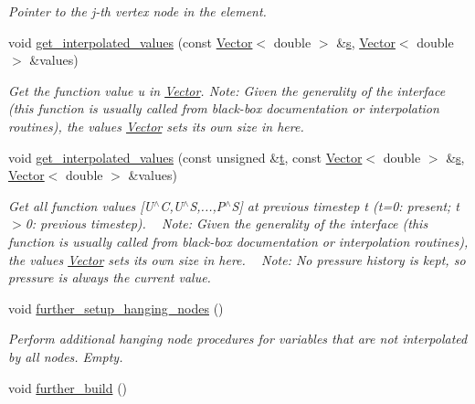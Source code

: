 \begin{DoxyCompactItemize}
\begin{DoxyCompactList}\small\item\em Pointer to the j-\/th vertex node in the element. \end{DoxyCompactList}\item 
void \hyperlink{classoomph_1_1RefineableLinearisedAxisymmetricQCrouzeixRaviartElement_afd5811a7632c57472e08dbcfa9aba843}{get\+\_\+interpolated\+\_\+values} (const \hyperlink{classoomph_1_1Vector}{Vector}$<$ double $>$ \&\hyperlink{cfortran_8h_ab7123126e4885ef647dd9c6e3807a21c}{s}, \hyperlink{classoomph_1_1Vector}{Vector}$<$ double $>$ \&values)
\begin{DoxyCompactList}\small\item\em Get the function value u in \hyperlink{classoomph_1_1Vector}{Vector}. Note\+: Given the generality of the interface (this function is usually called from black-\/box documentation or interpolation routines), the values \hyperlink{classoomph_1_1Vector}{Vector} sets its own size in here. \end{DoxyCompactList}\item 
void \hyperlink{classoomph_1_1RefineableLinearisedAxisymmetricQCrouzeixRaviartElement_a46c6b74a900afc0038bcd4f6c33c6c47}{get\+\_\+interpolated\+\_\+values} (const unsigned \&\hyperlink{cfortran_8h_af6f0bd3dc13317f895c91323c25c2b8f}{t}, const \hyperlink{classoomph_1_1Vector}{Vector}$<$ double $>$ \&\hyperlink{cfortran_8h_ab7123126e4885ef647dd9c6e3807a21c}{s}, \hyperlink{classoomph_1_1Vector}{Vector}$<$ double $>$ \&values)
\begin{DoxyCompactList}\small\item\em Get all function values \mbox{[}U$^\wedge$C,U$^\wedge$S,...,P$^\wedge$S\mbox{]} at previous timestep t (t=0\+: present; t$>$0\+: previous timestep). ~\newline
 Note\+: Given the generality of the interface (this function is usually called from black-\/box documentation or interpolation routines), the values \hyperlink{classoomph_1_1Vector}{Vector} sets its own size in here. ~\newline
Note\+: No pressure history is kept, so pressure is always the current value. \end{DoxyCompactList}\item 
void \hyperlink{classoomph_1_1RefineableLinearisedAxisymmetricQCrouzeixRaviartElement_ad2ea85dbb9ac3434f4314a020b45861f}{further\+\_\+setup\+\_\+hanging\+\_\+nodes} ()
\begin{DoxyCompactList}\small\item\em Perform additional hanging node procedures for variables that are not interpolated by all nodes. Empty. \end{DoxyCompactList}\item 
void \hyperlink{classoomph_1_1RefineableLinearisedAxisymmetricQCrouzeixRaviartElement_a075e75e685c8d0cd2851b36f6bd865e0}{further\+\_\+build} ()
\end{DoxyCompactItemize}

